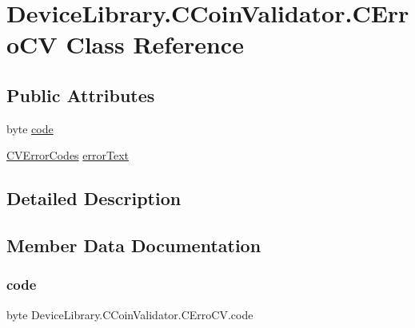 \hypertarget{class_device_library_1_1_c_coin_validator_1_1_c_erro_c_v}{}\section{Device\+Library.\+C\+Coin\+Validator.\+C\+Erro\+CV Class Reference}
\label{class_device_library_1_1_c_coin_validator_1_1_c_erro_c_v}


 


\subsection*{Public Attributes}
\begin{DoxyCompactItemize}
\item 
byte \mbox{\hyperlink{class_device_library_1_1_c_coin_validator_1_1_c_erro_c_v_a645b37f5a1414ee05ef237a4afbd8e43}{code}}
\item 
\mbox{\hyperlink{group___erreur_ga68c5b73cc3b337502d9f92154d933591}{C\+V\+Error\+Codes}} \mbox{\hyperlink{class_device_library_1_1_c_coin_validator_1_1_c_erro_c_v_a0d512c6ac4b9a6e46c8161b4e9cf9828}{error\+Text}}
\end{DoxyCompactItemize}


\subsection{Detailed Description}




\subsection{Member Data Documentation}
\mbox{\label{class_device_library_1_1_c_coin_validator_1_1_c_erro_c_v_a645b37f5a1414ee05ef237a4afbd8e43}} 
\subsubsection{\texorpdfstring{code}{code}}
{\footnotesize\ttfamily byte Device\+Library.\+C\+Coin\+Validator.\+C\+Erro\+C\+V.\+code}





